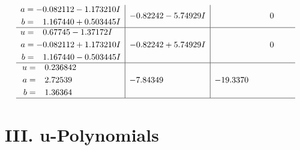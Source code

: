 \documentclass[1p]{elsarticle_modified}
\theoremstyle{definition}
\begin{document}
$$\begin{array}{c|c|c}
\begin{aligned}
a &= -0.082112 - 1.173210 I \\
b &= \phantom{-}1.167440 + 0.503445 I\end{aligned}
 & -0.82242 - 5.74929 I & \phantom{-0.000000 } 0 \\ \hline\begin{aligned}
u &= \phantom{-}0.67745 - 1.37172 I \\
a &= -0.082112 + 1.173210 I \\
b &= \phantom{-}1.167440 - 0.503445 I\end{aligned}
 & -0.82242 + 5.74929 I & \phantom{-0.000000 } 0 \\ \hline\begin{aligned}
u &= \phantom{-}0.236842\phantom{ +0.000000I} \\
a &= \phantom{-}2.72539\phantom{ +0.000000I} \\
b &= \phantom{-}1.36364\phantom{ +0.000000I}\end{aligned}
 & -7.84349\phantom{ +0.000000I} & -19.3370\phantom{ +0.000000I}\\
 \hline 
 \end{array}$$\newpage
\newpage\renewcommand{\arraystretch}{1}
\centering \section*{ III. u-Polynomials}
\end{document}
